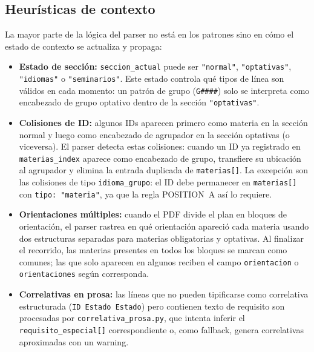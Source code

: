\documentclass[12pt, a4paper]{report}
\begin{document}
\subsection{Heurísticas de contexto}

La mayor parte de la lógica del parser no está en los patrones sino en cómo el
estado de contexto se actualiza y propaga:

\begin{itemize}
  \item \textbf{Estado de sección:} \texttt{seccion\_actual} puede ser
        \texttt{"normal"}, \texttt{"optativas"}, \texttt{"idiomas"} o
        \texttt{"seminarios"}. Este estado controla qué tipos de línea son válidos
        en cada momento: un patrón de grupo (\texttt{G\#\#\#\#}) solo se
        interpreta como encabezado de grupo optativo dentro de la sección
        \texttt{"optativas"}.

  \item \textbf{Colisiones de ID:} algunos IDs aparecen primero como materia en
        la sección normal y luego como encabezado de agrupador en la sección
        optativas (o viceversa). El parser detecta estas colisiones: cuando un ID
        ya registrado en \texttt{materias\_index} aparece como encabezado de grupo,
        transfiere su ubicación al agrupador y elimina la entrada duplicada de
        \texttt{materias[]}. La excepción son las colisiones de tipo
        \texttt{idioma\_grupo}: el ID debe permanecer en \texttt{materias[]} con
        \texttt{tipo: "materia"}, ya que la regla POSITION~A así lo requiere.

  \item \textbf{Orientaciones múltiples:} cuando el PDF divide el plan en bloques
        de orientación, el parser rastrea en qué orientación apareció cada materia
        usando dos estructuras separadas para materias obligatorias y optativas. Al
        finalizar el recorrido, las materias presentes en todos los bloques se
        marcan como comunes; las que solo aparecen en algunos reciben el campo
        \texttt{orientacion} o \texttt{orientaciones} según corresponda.

  \item \textbf{Correlativas en prosa:} las líneas que no pueden tipificarse como
        correlativa estructurada (\texttt{ID Estado Estado}) pero contienen texto de
        requisito son procesadas por \texttt{correlativa\_prosa.py}, que intenta
        inferir el \texttt{requisito\_especial[]} correspondiente o, como fallback,
        genera correlativas aproximadas con un warning.
\end{itemize}
\end{document}
